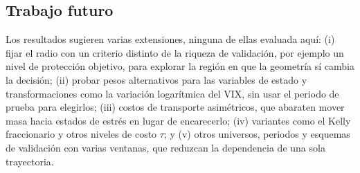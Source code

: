 \FloatBarrier %
\subsection{Trabajo futuro}\label{sec:disc_futuro}

Los resultados sugieren varias extensiones, ninguna de ellas evaluada aquí: (i) fijar el radio con un criterio distinto de la riqueza de validación, por ejemplo un nivel de protección objetivo, para explorar la región en que la geometría sí cambia la decisión; (ii) probar pesos alternativos para las variables de estado y transformaciones como la variación logarítmica del VIX, sin usar el periodo de prueba para elegirlos; (iii) costos de transporte asimétricos, que abaraten mover masa hacia estados de estrés en lugar de encarecerlo; (iv) variantes como el Kelly fraccionario y otros niveles de costo $\tau$; y (v) otros universos, periodos y esquemas de validación con varias ventanas, que reduzcan la dependencia de una sola trayectoria.

\FloatBarrier
